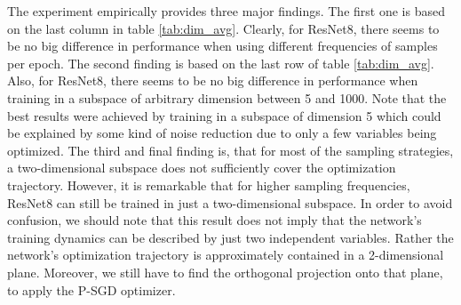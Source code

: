 \documentclass[11pt, a4paper]{article}
\begin{document}
The experiment empirically provides three major findings. The first one is based on the last column in table \ref{tab:dim_avg}. Clearly, for ResNet8, there seems to be no big difference in performance when using different frequencies of samples per epoch. The second finding is based on the last row of table \ref{tab:dim_avg}. Also, for ResNet8, there seems to be no big difference in performance when training in a subspace of arbitrary dimension between 5 and 1000. Note that the best results were achieved by training in a subspace of dimension 5 which could be explained by some kind of noise reduction due to only a few variables being optimized. The third and final finding is, that for most of the sampling strategies, a two-dimensional subspace does not sufficiently cover the optimization trajectory. However, it is remarkable that for higher sampling frequencies, ResNet8 can still be trained in just a two-dimensional subspace. In order to avoid confusion, we should note that this result does not imply that the network's training dynamics can be described by just two independent variables. Rather the network's optimization trajectory is approximately contained in a 2-dimensional plane. Moreover, we still have to find the orthogonal projection onto that plane, to apply the P-SGD optimizer. \\


\end{document}
